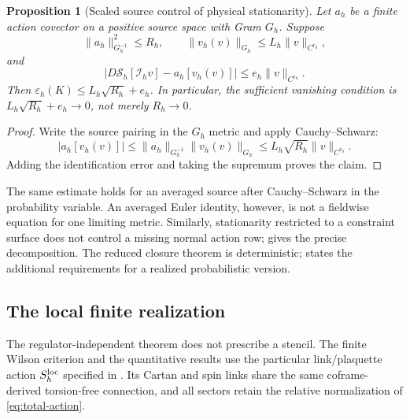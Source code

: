 \documentclass[11pt]{article}
\numberwithin{equation}{section}
\newtheorem{proposition}[proposition]{Proposition}
\theoremstyle{definition}
\theoremstyle{remark}
\newcommand{\norm}[1]{\lVert#1\rVert}
\newcommand{\abs}[1]{\lvert#1\rvert}
\newcommand{\Sact}{\mathscr S}
\begin{document}
\begin{proposition}[Scaled source control of physical stationarity]
\label{prop:source-bound}
Let $a_h$ be a finite action covector on a positive source space with Gram $G_h$. Suppose
\[
 \norm{a_h}_{G_h^{-1}}^2\le R_h,
 \qquad \norm{v_h(v)}_{G_h}\le L_h\norm v_{C^{r_0}},
\]
and
\[
 \abs{D\Sact_h[\mathcal I_hv]-a_h[v_h(v)]}
 \le e_h\norm v_{C^{r_0}}.
\]
Then $\varepsilon_h(K)\le L_h\sqrt{R_h}+e_h$. In particular, the sufficient vanishing condition is $L_h\sqrt{R_h}+e_h\to0$, not merely $R_h\to0$.
\end{proposition}
\begin{proof}
Write the source pairing in the $G_h$ metric and apply Cauchy--Schwarz:
\[
 \abs{a_h[v_h(v)]}
 \le\norm{a_h}_{G_h^{-1}}\norm{v_h(v)}_{G_h}
 \le L_h\sqrt{R_h}\norm v_{C^{r_0}}.
\]
Adding the identification error and taking the supremum proves the claim.
\end{proof}

The same estimate holds for an averaged source after Cauchy--Schwarz in the probability variable. An averaged Euler identity, however, is not a fieldwise equation for one limiting metric.  Similarly, stationarity restricted to a constraint surface does not control a missing normal action row;  gives the precise decomposition. The reduced closure theorem is deterministic;  states the additional requirements for a realized probabilistic version.

\subsection{The local finite realization}
\label{subsec:local-action-conventions}

The regulator-independent theorem does not prescribe a stencil. The
finite Wilson criterion and the quantitative results use the particular
link/plaquette action $S_h^{\rm loc}$ specified in .
Its Cartan and spin links share the same coframe-derived torsion-free
connection, and all sectors retain the relative normalization of
\eqref{eq:total-action}.
\end{document}
